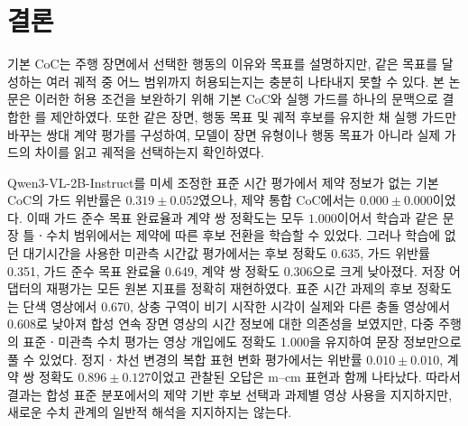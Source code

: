 \section{결론}
\label{sec:conclusion}

기본 CoC는 주행 장면에서 선택한 행동의 이유와 목표를 설명하지만, 같은 목표를 달성하는 여러 궤적 중 어느 범위까지 허용되는지는 충분히 나타내지 못할 수 있다. 본 논문은 이러한 허용 조건을 보완하기 위해 기본 CoC와 실행 가드를 하나의 문맥으로 결합한 \sccoc{}를 제안하였다. 또한 같은 장면, 행동 목표 및 궤적 후보를 유지한 채 실행 가드만 바꾸는 쌍대 계약 평가를 구성하여, 모델이 장면 유형이나 행동 목표가 아니라 실제 가드의 차이를 읽고 궤적을 선택하는지 확인하였다.

Qwen3-VL-2B-Instruct를 미세 조정한 표준 시간 평가에서 제약 정보가 없는 기본 CoC의 가드 위반률은 $0.319\pm0.052$였으나, 제약 통합 CoC에서는 $0.000\pm0.000$이었다. 이때 가드 준수 목표 완료율과 계약 쌍 정확도는 모두 $1.000$이어서 학습과 같은 문장 틀ㆍ수치 범위에서는 제약에 따른 후보 전환을 학습할 수 있었다. 그러나 학습에 없던 대기시간을 사용한 미관측 시간값 평가에서는 후보 정확도 0.635, 가드 위반률 0.351, 가드 준수 목표 완료율 0.649, 계약 쌍 정확도 0.306으로 크게 낮아졌다. 저장 어댑터의 재평가는 모든 원본 지표를 정확히 재현하였다. 표준 시간 과제의 후보 정확도는 단색 영상에서 0.670, 상충 구역이 비기 시작한 시각이 실제와 다른 충돌 영상에서 0.608로 낮아져 합성 연속 장면 영상의 시간 정보에 대한 의존성을 보였지만, 다중 주행의 표준ㆍ미관측 수치 평가는 영상 개입에도 정확도 1.000을 유지하여 문장 정보만으로 풀 수 있었다. 정지ㆍ차선 변경의 복합 표현 변화 평가에서는 위반률 $0.010\pm0.010$, 계약 쌍 정확도 $0.896\pm0.127$이었고 관찰된 오답은 m--cm 표현과 함께 나타났다.  따라서 결과는 합성 표준 분포에서의 제약 기반 후보 선택과 과제별 영상 사용을 지지하지만, 새로운 수치 관계의 일반적 해석을 지지하지는 않는다.


